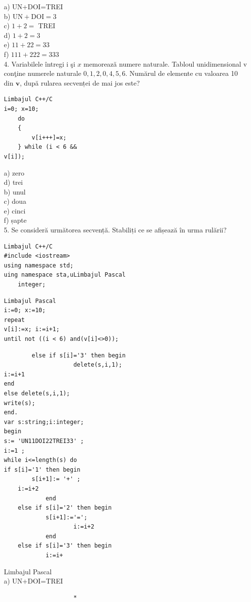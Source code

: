 \documentclass[10pt]{article}
\begin{document}
a) UN+DOI=TREI\\
b) $\mathrm{UN}+\mathrm{DOI}=3$\\
c) $1+2=$ TREI\\
d) $1+2=3$\\
e) $11+22=33$\\
f) $111+222=333$\\
4. Variabilele întregi i şi $x$ memorează numere naturale. Tabloul unidimensional v conţine numerele naturale $0,1,2,0,4,5,6$. Numărul de elemente cu valoarea 10 din $\mathbf{v}$, după rularea secvenței de mai jos este?

\begin{verbatim}
Limbajul C++/C
i=0; x=10;
    do
    {
        v[i+++]=x;
    } while (i < 6 &&
v[i]);
\end{verbatim}

a) zero\\
d) trei\\
b) unul\\
c) doua\\
e) cinci\\
f) șapte\\
5. Se consideră următorea secvență. Stabiliți ce se afișează în urma rulării?

\begin{verbatim}
Limbajul C++/C
#include <iostream>
using namespace std;
uing namespace sta,uLimbajul Pascal
    integer;
\end{verbatim}

\begin{verbatim}
Limbajul Pascal
i:=0; x:=10;
repeat
v[i]:=x; i:=i+1;
until not ((i < 6) and(v[i]<>0));
\end{verbatim}

\begin{verbatim}
        else if s[i]='3' then begin
                    delete(s,i,1);
i:=i+1
end
else delete(s,i,1);
write(s);
end.
var s:string;i:integer;
begin
s:= 'UN11DOI22TREI33' ;
i:=1 ;
while i<=length(s) do
if s[i]='1' then begin
        s[i+1]:= '+' ;
    i:=i+2
            end
    else if s[i]='2' then begin
            s[i+1]:='=';
                    i:=i+2
            end
    else if s[i]='3' then begin
            i:=i+
\end{verbatim}

Limbajul Pascal\\
a) UN+DOI=TREI

\begin{verbatim}
                    *
\end{verbatim}
\end{document}
